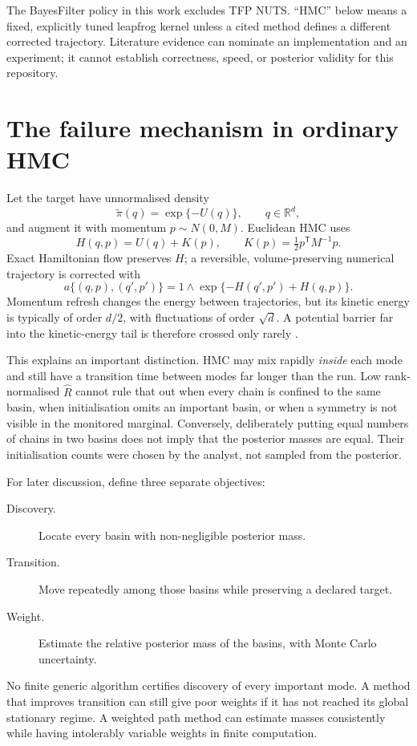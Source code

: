 \documentclass[11pt]{article}
\newcommand{\R}{\mathbb{R}}
\begin{document}
The BayesFilter policy in this work excludes TFP NUTS.  ``HMC'' below means a
fixed, explicitly tuned leapfrog kernel unless a cited method defines a different
corrected trajectory.  Literature evidence can nominate an implementation and an
experiment; it cannot establish correctness, speed, or posterior validity for this
repository.

\section{The failure mechanism in ordinary HMC}

Let the target have unnormalised density
\begin{equation}
  \widetilde\pi(q)=\exp\{-U(q)\}, \qquad q\in\R^d,
\end{equation}
and augment it with momentum $p\sim N(0,M)$.  Euclidean HMC uses
\begin{equation}
  H(q,p)=U(q)+K(p), \qquad K(p)=\tfrac12p^\mathsf{T}M^{-1}p.
\end{equation}
Exact Hamiltonian flow preserves $H$; a reversible, volume-preserving numerical
trajectory is corrected with
\begin{equation}
  a\{(q,p),(q',p')\}=1\wedge
  \exp\{-H(q',p')+H(q,p)\}.
  \label{eq:hmc-accept}
\end{equation}
Momentum refresh changes the energy between trajectories, but its kinetic energy is
typically of order $d/2$, with fluctuations of order $\sqrt d$.  A potential barrier
far into the kinetic-energy tail is therefore crossed only rarely
\citep{betancourt2017conceptual,graham2017continuous,nishimura2020geometric}.

This explains an important distinction.  HMC may mix rapidly \emph{inside} each
mode and still have a transition time between modes far longer than the run.  Low
rank-normalised $\widehat R$ cannot rule that out when every chain is confined to the
same basin, when initialisation omits an important basin, or when a symmetry is not
visible in the monitored marginal.  Conversely, deliberately putting equal numbers
of chains in two basins does not imply that the posterior masses are equal.  Their
initialisation counts were chosen by the analyst, not sampled from the posterior.

For later discussion, define three separate objectives:
\begin{description}
  \item[Discovery.] Locate every basin with non-negligible posterior mass.
  \item[Transition.] Move repeatedly among those basins while preserving a declared
        target.
  \item[Weight.] Estimate the relative posterior mass of the basins, with Monte Carlo
        uncertainty.
\end{description}
No finite generic algorithm certifies discovery of every important mode.  A method
that improves transition can still give poor weights if it has not reached its global
stationary regime.  A weighted path method can estimate masses consistently while
having intolerably variable weights in finite computation.
\end{document}
